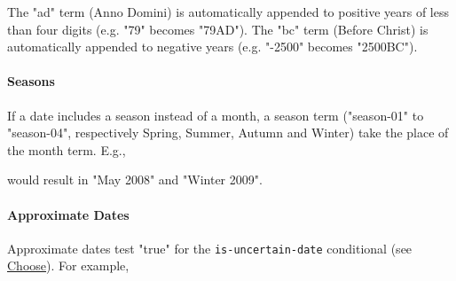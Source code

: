 The "ad" term (Anno Domini) is automatically appended to positive years
of less than four digits (e.g. "79" becomes "79AD"). The "bc" term
(Before Christ) is automatically appended to negative years (e.g.
"-2500" becomes "2500BC").

\hypertarget{seasons}{%
\paragraph{Seasons}\label{seasons}}

If a date includes a season instead of a month, a season term
("season-01" to "season-04", respectively Spring, Summer, Autumn and
Winter) take the place of the month term. E.g.,

\begin{Shaded}
\begin{Highlighting}[]
\NormalTok{\textless{}}\NormalTok{\textgreater{}}
\NormalTok{  \textless{}}\NormalTok{\textgreater{}}
\NormalTok{    \textless{}}\NormalTok{\textgreater{}}
\NormalTok{      \textless{}}\NormalTok{\textgreater{}}
\NormalTok{        \textless{}}\NormalTok{/\textgreater{}}
\NormalTok{        \textless{}}\NormalTok{/\textgreater{}}
\NormalTok{      \textless{}/}\NormalTok{\textgreater{}}
\NormalTok{    \textless{}/}\NormalTok{\textgreater{}}
\NormalTok{  \textless{}/}\NormalTok{\textgreater{}}
\NormalTok{\textless{}/}\NormalTok{\textgreater{}}
\end{Highlighting}
\end{Shaded}

would result in "May 2008" and "Winter 2009".

\hypertarget{approximate-dates}{%
\paragraph{Approximate Dates}\label{approximate-dates}}

Approximate dates test "true" for the \texttt{is-uncertain-date}
conditional (see \protect\hyperlink{choose}{Choose}). For example,

